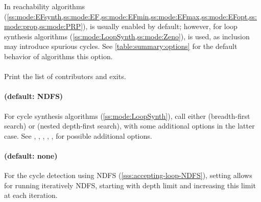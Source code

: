 In reachability algorithms (\cref{ss:mode:EFsynth,ss:mode:EF,ss:mode:EFmin,ss:mode:EFmax,ss:mode:EFopt,ss:mode:prop,ss:mode:PRP}),  is usually enabled by default; however, for loop synthesis algorithms (\cref{ss:mode:LoopSynth,ss:mode:Zeno}),  is used, as inclusion may introduce spurious cycles.
%
See \cref{table:summary:options} for the default behavior of algorithms \wrt{} this option.




%


\paragraph{}
Print the list of contributors and exits.



\paragraph{ (default: NDFS)}
For cycle synthesis algorithms (\cref{ss:mode:LoopSynth}), call either  (breadth-first search) or  (nested depth-first search), with some additional options in the latter case.
See
	,
	,
	,
	,
	,
for possible additional options.




\paragraph{ (default: none)}
For the cycle detection using NDFS (\cref{sss:accepting-loop-NDFS}),
setting  allows for running iteratively NDFS,
starting with depth limit  and increasing this limit
at each iteration.

